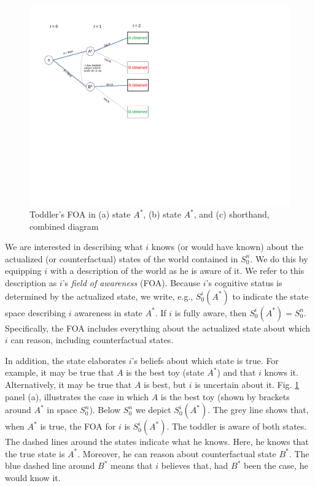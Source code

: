 \documentclass[
11pt,
titlepage,
reqno,
]{article}%
\theoremstyle{definition}
\begin{document}
\begin{figure}[h!]
	\centering
	\includegraphics*[page=3,trim = 0in 4.5in 0in .5in,scale=.7]{Awareness_Diagrams_All}
	\caption{Toddler's FOA in (a) state $A^\ast$, (b) state $A^\ast$, and (c) shorthand, combined diagram\label{Diag: p-03}}%
\end{figure}

We are interested in describing what $i$ knows (or would have known) about the actualized (or counterfactual) states of the world contained in $S^n_0$. We do this by equipping $i$ with a description of the world as he is aware of it. We refer to this description as $i$'s \textit{field of awareness} (FOA). Because $i$'s cognitive status is determined by the actualized state, we write, e.g.,  $S^i_0(A^\ast)$ to indicate the state space describing $i$ awareness in state $A^\ast$. If $i$ is fully aware, then $S^i_0(A^\ast)=S^n_0$. Specifically, the FOA includes everything about the actualized state about which $i$ can reason, including counterfactual states. 

In addition, the state elaborates $i$'s beliefs about which state is true. For example, it may be true that $A$ is the best toy (state $A^\ast$) and that $i$ knows it. Alternatively, it may be true that $A$ is best, but $i$ is uncertain about it. Fig. \ref{Diag: p-03} panel (a), illustrates the case in which $A$ is the best toy (shown by brackets around $A^\ast$ in space $S^n_0$). Below $S^n_0$ we depict $S^i_0(A^\ast)$. The grey line shows that, when $A^\ast$ is true, the FOA for $i$ is $S^i_0(A^\ast)$. The toddler is aware of both states. The dashed lines around the states indicate what he knows. Here, he knows that the true state is $A^\ast$. Moreover, he can reason about counterfactual state $B^\ast$. The blue dashed line around $B^\ast$ means that $i$ believes that, had $B^\ast$ been the case, he would know it. 
\end{document}

